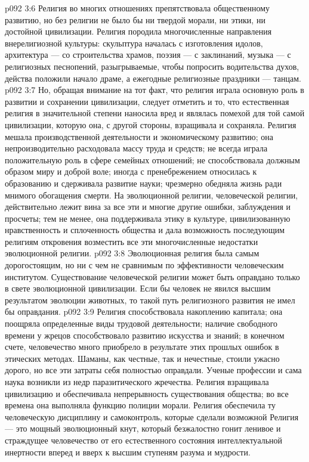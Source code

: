 \vs p092 3:6 Религия во многих отношениях препятствовала общественному развитию, но без религии не было бы ни твердой морали, ни этики, ни достойной цивилизации. Религия породила многочисленные направления внерелигиозной культуры: скульптура началась с изготовления идолов, архитектура --- со строительства храмов, поэзия --- с заклинаний, музыка --- с религиозных песнопений, разыгрываемые, чтобы попросить водительства духов, действа положили начало драме, а ежегодные религиозные праздники --- танцам.
\vs p092 3:7 Но, обращая внимание на тот факт, что религия играла основную роль в развитии и сохранении цивилизации, следует отметить и то, что естественная религия в значительной степени наносила вред и являлась помехой для той самой цивилизации, которую она, с другой стороны, взращивала и сохраняла. Религия мешала производственной деятельности и экономическому развитию; она непроизводительно расходовала массу труда и средств; не всегда играла положительную роль в сфере семейных отношений; не способствовала должным образом миру и доброй воле; иногда с пренебрежением относилась к образованию и сдерживала развитие науки; чрезмерно обедняла жизнь ради мнимого обогащения смерти. На эволюционной религии, человеческой религии, действительно лежит вина за все эти и многие другие ошибки, заблуждения и просчеты; тем не менее, она поддерживала этику в культуре, цивилизованную нравственность и сплоченность общества и дала возможность последующим религиям откровения возместить все эти многочисленные недостатки эволюционной религии.
\vs p092 3:8 \pc Эволюционная религия была самым дорогостоящим, но ни с чем не сравнимым по эффективности человеческим институтом. Существование человеческой религии может быть оправдано только в свете эволюционной цивилизации. Если бы человек не явился высшим результатом эволюции животных, то такой путь религиозного развития не имел бы оправдания.
\vs p092 3:9 \pc Религия способствовала накоплению капитала; она поощряла определенные виды трудовой деятельности; наличие свободного времени у жрецов способствовало развитию искусства и знаний; в конечном счете, человечество много приобрело в результате этих прошлых ошибок в этических методах. Шаманы, как честные, так и нечестные, стоили ужасно дорого, но все эти затраты себя полностью оправдали. Ученые профессии и сама наука возникли из недр паразитического жречества. Религия взращивала цивилизацию и обеспечивала непрерывность существования общества; во все времена она выполняла функцию полиции морали. Религия обеспечила ту человеческую дисциплину и самоконтроль, которые сделали возможной  Религия --- это мощный эволюционный кнут, который безжалостно гонит ленивое и страждущее человечество от его естественного состояния интеллектуальной инертности вперед и вверх к высшим ступеням разума и мудрости.
